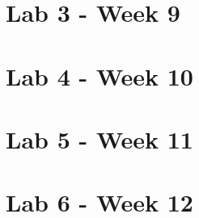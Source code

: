 \documentclass{article}
\begin{document}
\newpage
\section{Lab 3 - Week 9}%
\label{sec:lab_week_9}


\newpage
\section{Lab 4 - Week 10}



\newpage
\section{Lab 5 - Week 11}


\newpage
\section{Lab 6 - Week 12}

\newpage
\printbibliography
\end{document}
